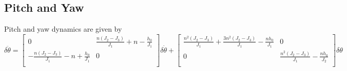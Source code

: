 \documentclass[]{article}
\begin{document}
\subsection{Pitch and Yaw}
Pitch and yaw dynamics are given by
\begin{equation}
	\delta \ddot{\theta} = \begin{bmatrix}
	0 & \frac{n(J_2 - J_3)}{J_1} + n - \frac{h_0}{J_1} \\
	- \frac{n(J_2 - J_3)}{J_1} - n + \frac{h_0}{J_1} & 0 \\
	\end{bmatrix}
	\delta \dot{\theta} + \begin{bmatrix}
	\frac{n^2(J_2 - J_3)}{J_1} + \frac{3n^2(J_2 - J_3)}{J_1} - \frac{n h_0}{J_1} & 0 \\
	0 & \frac{n^2(J_2 - J_3)}{J_1} - \frac{n h_0}{J_2} \\
	\end{bmatrix}
	\delta \theta
\end{equation}
\end{document}
